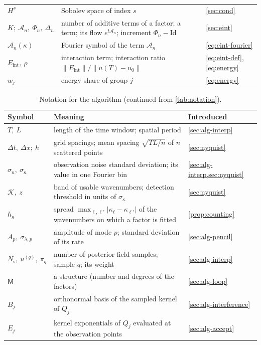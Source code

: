 \documentclass[11pt]{article}
\theoremstyle{plain}
\theoremstyle{definition}
\theoremstyle{remark}
\newcommand{\Id}{\mathrm{Id}}
\newcommand{\Eint}{E_{\mathrm{int}}}        %
\newcommand{\flow}{\Phi}                    %
\newcommand{\Hs}{H^{s}}                     %
\newcommand{\noise}{\sigma_{n}}             %
\newcommand{\sigbin}{\sigma_{\kappa}}       %
\newcommand{\Nsamp}{N_{\mathrm s}}          %
\newcommand{\Mfit}{\mathsf{M}}              %
\newcommand{\abs}[1]{\lvert#1\rvert}
\newcommand{\norm}[1]{\lVert#1\rVert}
\begin{document}
\begin{table}[htbp]
\begin{tabularx}{\linewidth}{@{}l X l@{}}
$\Hs$ & Sobolev space of index $s$ & \cref{sec:cond}\\
$K;\ \mathcal A_n,\ \flow_n,\ \Delta_n$ & number of additive terms of a factor; a term; its flow $e^{t\mathcal A_n}$; increment $\flow_n-\Id$ & \cref{sec:eint}\\
$\hat{\mathcal A}_n(\kappa)$ & Fourier symbol of the term $\mathcal A_n$ & \eqref{eq:eint-fourier}\\
$\Eint,\ \rho$ & interaction term; interaction ratio $\norm{\Eint}/\norm{u(T)-u_0}$ & \eqref{eq:eint-def}, \eqref{eq:energy}\\
$w_j$ & energy share of group $j$ & \eqref{eq:energy}\\
\bottomrule
\end{tabularx}
\end{table}

\begin{table}[htbp]
\centering\small
\caption{Notation for the algorithm (continued from \cref{tab:notation}).}\label{tab:notation-alg}
\begin{tabularx}{\linewidth}{@{}l X l@{}}
\toprule
Symbol & Meaning & Introduced\\
\midrule
$T,\ L$ & length of the time window; spatial period & \cref{sec:alg-interp}\\
$\Delta t,\ \Delta x;\ h$ & grid spacings; mean spacing $\sqrt{TL/n}$ of $n$ scattered points & \cref{sec:nyquist}\\
$\noise,\ \sigbin$ & observation noise standard deviation; its value in one Fourier bin & \cref{sec:alg-interp,sec:nyquist}\\
$\mathcal K,\ z$ & band of usable wavenumbers; detection threshold in units of $\sigbin$ & \cref{sec:nyquist}\\
$h_\kappa$ & spread $\max_{\ell,\ell'}\abs{\kappa_\ell-\kappa_{\ell'}}$ of the wavenumbers on which a factor is fitted & \cref{prop:counting}\\
$A_p,\ \sigma_{\lambda,p}$ & amplitude of mode $p$; standard deviation of its rate & \cref{sec:alg-pencil}\\
$\Nsamp,\ u^{(q)},\ \pi_q$ & number of posterior field samples; sample $q$; its weight & \cref{sec:alg-interp}\\
$\Mfit$ & a structure (number and degrees of the factors) & \cref{sec:alg-loop}\\
$B_j$ & orthonormal basis of the sampled kernel of $Q_j$ & \cref{sec:alg-interference}\\
$E_j$ & kernel exponentials of $Q_j$ evaluated at the observation points & \cref{sec:alg-accept}\\

\end{tabularx}
\end{table}
\end{document}
